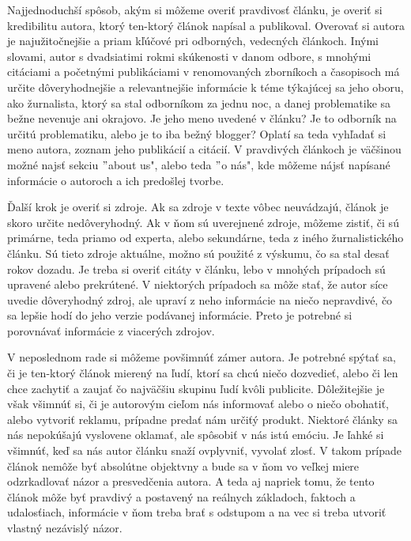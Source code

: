 \documentclass{sig-alternate}
\begin{document}
Najjednoduchší spôsob, akým si môžeme overiť pravdivosť článku, je overiť si kredibilitu autora,\cite{d} ktorý ten-ktorý článok napísal a publikoval. Overovať si autora je najužitočnejšie a priam kľúčové pri odborných, vedecných článkoch. Inými slovami, autor s dvadsiatimi rokmi skúkenosti v danom odbore, s mnohými citáciami a početnými publikáciami v renomovaných zborníkoch a časopisoch má určite dôveryhodnejšie a relevantnejšie informácie k téme týkajúcej sa jeho oboru, ako žurnalista, ktorý sa stal odborníkom za jednu noc, a danej problematike sa bežne nevenuje ani okrajovo. Je jeho meno uvedené v článku? Je to odborník na určitú problematiku, alebo je to iba bežný blogger? Oplatí sa teda vyhľadať si meno autora, zoznam jeho publikácií a citácií. V pravdivých článkoch je väčšinou možné najsť sekciu $"$about us", alebo teda $"$o nás", kde môžeme nájsť napísané informácie o autoroch a ich predošlej tvorbe.

Ďalší krok je overiť si zdroje. \cite{c}Ak sa zdroje v texte vôbec neuvádzajú, článok je skoro určite nedôveryhodný. Ak v ňom sú uverejnené zdroje, môžeme zistiť, či sú primárne, teda priamo od experta, alebo sekundárne, teda z iného žurnalistického článku. Sú tieto zdroje aktuálne, možno sú použité z výskumu, čo sa stal desať rokov dozadu. Je treba si overiť citáty v článku, lebo v mnohých prípadoch sú upravené alebo prekrútené. V niektorých prípadoch sa môže stať, že autor síce uvedie dôveryhodný zdroj, ale upraví z neho informácie na niečo nepravdivé, čo sa lepšie hodí do jeho verzie podávanej informácie. Preto je potrebné si porovnávať informácie z viacerých zdrojov.

V neposlednom rade si môžeme povšimnúť zámer autora. Je potrebné spýtať sa, či je ten-ktorý článok mierený na ľudí, ktorí sa chcú niečo dozvedieť, alebo či len chce zachytiť a zaujať čo najväčšiu skupinu ľudí kvôli publicite. Dôležitejšie je však všimnúť si, či je autorovým cieľom nás informovať alebo o niečo obohatiť, alebo vytvoriť reklamu, prípadne predať nám určiťý produkt. Niektoré články sa nás nepokúšajú vyslovene oklamať, ale spôsobiť v nás istú emóciu. Je ľahké si všimnúť, keď sa nás autor článku snaží ovplyvniť, vyvolať zlosť. V takom prípade článok nemôže byť absolútne objektvny a bude sa v ňom vo veľkej miere odzrkadlovať názor a presvedčenia autora. A teda aj napriek tomu, že tento článok môže byť pravdivý a postavený na reálnych základoch, faktoch a udalosťiach, informácie v ňom treba brať s odstupom a na vec si treba utvoriť vlastný nezávislý názor. 
\end{document}
